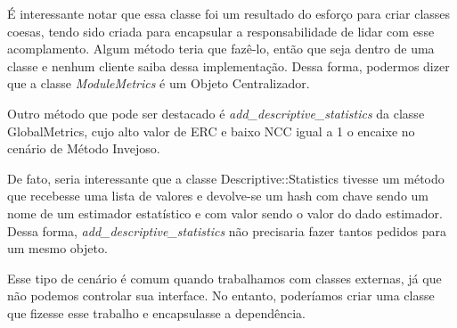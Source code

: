 É interessante notar que essa classe foi um resultado do esforço para criar classes coesas, tendo sido
criada para encapsular a responsabilidade de lidar com esse acomplamento. Algum método teria que fazê-lo,
então que seja dentro de uma classe e nenhum cliente saiba dessa implementação. Dessa forma, podermos dizer
que a classe \textit{ModuleMetrics} é um Objeto Centralizador.

Outro método que pode ser destacado é \textit{add\_descriptive\_statistics} da classe GlobalMetrics, cujo 
alto valor de ERC e baixo NCC igual a 1 o encaixe no cenário de Método Invejoso.



De fato, seria interessante que a classe Descriptive::Statistics tivesse um método que recebesse
uma lista de valores e devolve-se um hash com chave sendo um nome de um estimador estatístico e 
com valor sendo o valor do dado estimador. Dessa forma, \textit{add\_descriptive\_statistics} não precisaria
fazer tantos pedidos para um mesmo objeto.

Esse tipo de cenário é comum quando trabalhamos com classes externas, já que não podemos controlar
sua interface. No entanto, poderíamos criar uma classe que fizesse esse trabalho e encapsulasse
a dependência.

